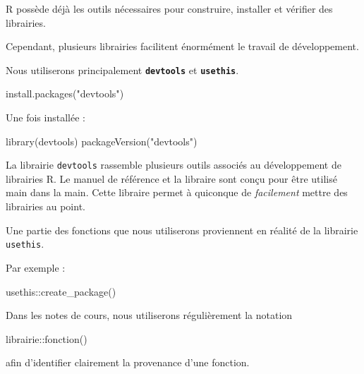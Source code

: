\documentclass[
  letterpaper,
  DIV=11,
  numbers=noendperiod]{scrreprt}
\newenvironment{Shaded}{\begin{snugshade}}{\end{snugshade}}
\newcommand{\FunctionTok}[1]{\textcolor[rgb]{0.28,0.35,0.67}{#1}}
\newcommand{\NormalTok}[1]{\textcolor[rgb]{0.00,0.23,0.31}{#1}}
\newcommand{\SpecialCharTok}[1]{\textcolor[rgb]{0.37,0.37,0.37}{#1}}
\newcommand{\StringTok}[1]{\textcolor[rgb]{0.13,0.47,0.30}{#1}}
\begin{document}

R possède déjà les outils nécessaires pour construire, installer et
vérifier des librairies.

Cependant, plusieurs librairies facilitent énormément le travail de
développement.

Nous utiliserons principalement \textbf{\texttt{devtools}} et
\textbf{\texttt{usethis}}.

\begin{Shaded}
\begin{Highlighting}[]
\FunctionTok{install.packages}\NormalTok{(}\StringTok{"devtools"}\NormalTok{)}
\end{Highlighting}
\end{Shaded}

Une fois installée :

\begin{Shaded}
\begin{Highlighting}[]
\FunctionTok{library}\NormalTok{(devtools)}
\FunctionTok{packageVersion}\NormalTok{(}\StringTok{"devtools"}\NormalTok{)}
\end{Highlighting}
\end{Shaded}

La librairie \texttt{devtools} rassemble plusieurs outils associés au
développement de librairies R. Le manuel de référence et la libraire
sont conçu pour être utilisé main dans la main. Cette libraire permet à
quiconque de \emph{facilement} mettre des librairies au point.

Une partie des fonctions que nous utiliserons proviennent en réalité de
la librairie \texttt{usethis}.

Par exemple :

\begin{Shaded}
\begin{Highlighting}[]
\NormalTok{usethis}\SpecialCharTok{::}\FunctionTok{create\_package}\NormalTok{()}
\end{Highlighting}
\end{Shaded}

Dans les notes de cours, nous utiliserons régulièrement la notation

\begin{Shaded}
\begin{Highlighting}[]
\NormalTok{librairie::fonction()}
\end{Highlighting}
\end{Shaded}

afin d'identifier clairement la provenance d'une fonction.
\end{document}
